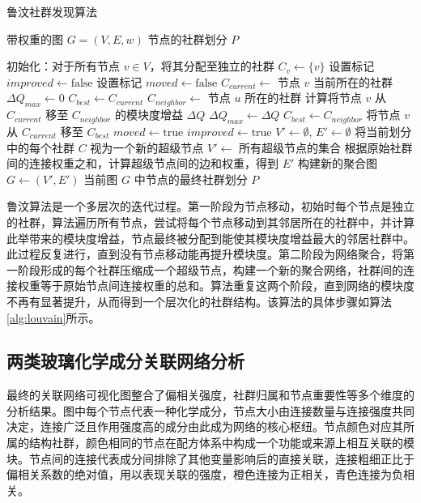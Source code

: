 \begin{algorithm}[htbp]
	\caption{鲁汶社群发现算法}
	\label{alg:louvain}
	\begin{algorithmic}[1]
		\Require
		\Statex 带权重的图 $G = (V, E, w)$
		\Ensure
		\Statex 节点的社群划分 $P$

		\State 初始化：对于所有节点 $v \in V$，将其分配至独立的社群 $C_v \leftarrow \{v\}$
		\Repeat
			\State 设置标记 $improved \leftarrow \text{false}$
			\State {}
			\Repeat
				\State 设置标记 $moved \leftarrow \text{false}$
					\State $C_{current} \leftarrow$ 节点 $v$ 当前所在的社群
					\State $\Delta Q_{max} \leftarrow 0$
					\State $C_{best} \leftarrow C_{current}$
						\State $C_{neighbor} \leftarrow$ 节点 $u$ 所在的社群
							\State 计算将节点 $v$ 从 $C_{current}$ 移至 $C_{neighbor}$ 的模块度增益 $\Delta Q$
								\State $\Delta Q_{max} \leftarrow \Delta Q$
								\State $C_{best} \leftarrow C_{neighbor}$
							\EndIf
						\EndIf
					\EndFor
						\State 将节点 $v$ 从 $C_{current}$ 移至 $C_{best}$
						\State $moved \leftarrow \text{true}$
						\State $improved \leftarrow \text{true}$
					\EndIf
				\EndFor
			\State {}
				\State $V' \leftarrow \emptyset$, $E' \leftarrow \emptyset$
				\State 将当前划分中的每个社群 $C$ 视为一个新的超级节点
				\State $V' \leftarrow$ 所有超级节点的集合
				\State 根据原始社群间的连接权重之和，计算超级节点间的边和权重，得到 $E'$
				\State 构建新的聚合图 $G \leftarrow (V', E')$
			\EndIf
		\State \Return 当前图 $G$ 中节点的最终社群划分 $P$
	\end{algorithmic}
\end{algorithm}


鲁汶算法是一个多层次的迭代过程。第一阶段为节点移动，初始时每个节点是独立的社群，算法遍历所有节点，尝试将每个节点移动到其邻居所在的社群中，并计算此举带来的模块度增益，节点最终被分配到能使其模块度增益最大的邻居社群中。此过程反复进行，直到没有节点移动能再提升模块度。第二阶段为网络聚合，将第一阶段形成的每个社群压缩成一个超级节点，构建一个新的聚合网络，社群间的连接权重等于原始节点间连接权重的总和。算法重复这两个阶段，直到网络的模块度不再有显著提升，从而得到一个层次化的社群结构。该算法的具体步骤如算法\ref{alg:louvain}所示。


\subsection{两类玻璃化学成分关联网络分析}
最终的关联网络可视化图整合了偏相关强度，社群归属和节点重要性等多个维度的分析结果。图中每个节点代表一种化学成分，节点大小由连接数量与连接强度共同决定，连接广泛且作用强度高的成分由此成为网络的核心枢纽。节点颜色对应其所属的结构社群，颜色相同的节点在配方体系中构成一个功能或来源上相互关联的模块。节点间的连接代表成分间排除了其他变量影响后的直接关联，连接粗细正比于偏相关系数的绝对值，用以表现关联的强度，橙色连接为正相关，青色连接为负相关。

